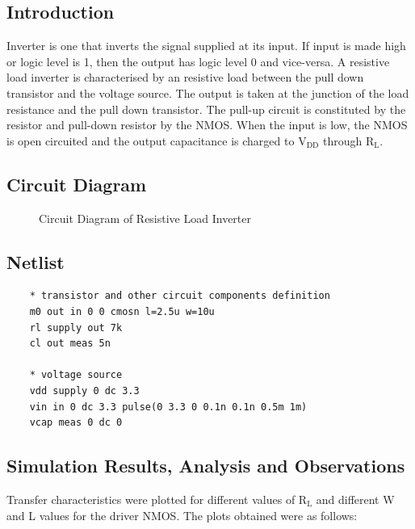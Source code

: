 \documentclass[12pt]{article}
\begin{document}
	\subsection{Introduction}
	Inverter is one that inverts the signal supplied at its input. If input is made high or logic level is 1, then the output has logic level 0 and vice-versa. A resistive load inverter is characterised by an resistive load between the pull down transistor and the voltage source. The output is taken at the junction of the load resistance and the pull down transistor. The pull-up circuit is constituted by the resistor and pull-down resistor by the NMOS. When the input is low, the NMOS is open circuited and the output capacitance is charged to $\text{V}_\text{DD}$ through $\text{R}_\text{L}$.
	
	\subsection{Circuit Diagram}
	\begin{figure}[H]
		\begin{center}
			
			\caption{Circuit Diagram of Resistive Load Inverter}
			\label{fig::resloadckt}
		\end{center}
	\end{figure}

	\subsection{Netlist}
    \begin{lstlisting}
    * transistor and other circuit components definition
    m0 out in 0 0 cmosn l=2.5u w=10u
    rl supply out 7k
    cl out meas 5n
    
    * voltage source
    vdd supply 0 dc 3.3
    vin in 0 dc 3.3 pulse(0 3.3 0 0.1n 0.1n 0.5m 1m)
    vcap meas 0 dc 0
    \end{lstlisting}
    
    \subsection{Simulation Results, Analysis and Observations}
    
    Transfer characteristics were plotted for different values of $\text{R}_\text{L}$ and different W and L values for the driver NMOS. The plots obtained were as follows:
    
\end{document}
